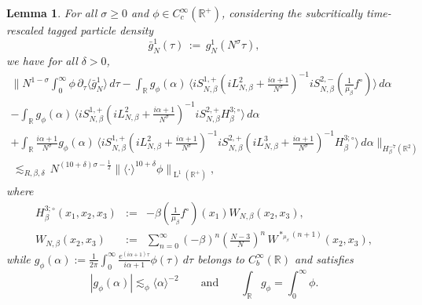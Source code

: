 \documentclass[a4paper,11pt,reqno,noindent]{amsart}
\theoremstyle{plain}
\newtheorem{lem}{Lemma}[section]
\numberwithin{equation}{section}
\newcommand{\R}{\mathbb R}
\newcommand{\3}{|\!|\!|}
\newcommand{\Ld}{\operatorname{L}}
\begin{document}
\begin{lem}\label{lem:laplace-NG}
For all $\sigma\ge0$ and $\phi\in C^\infty_c(\R^+)$, considering the subcritically time-rescaled tagged particle density
\[\bar g_N^{1}(\tau)\,:=\, g_N^1(N^\sigma\tau),\]
we have for all $\delta>0$,
\begin{multline*}
\Big\|N^{1-\sigma}\int_0^\infty\phi\,\partial_\tau \langle\bar g_N^1\rangle\,d\tau-\int_\R g_\phi(\alpha)\,\big\langle iS_{N,\beta}^{1,+}(iL_{N,\beta}^2+\tfrac{i\alpha+1}{N^\sigma})^{-1} iS_{N,\beta}^{2,-}(\tfrac1{\mu_\beta}f^\circ)\big\rangle\,d\alpha\\
-\int_\R g_\phi(\alpha)\,\big\langle iS_{N,\beta}^{1,+}(iL_{N,\beta}^2+\tfrac{i\alpha+1}{N^\sigma})^{-1}iS_{N,\beta}^{2,+}H_\beta^{3;\circ}\big\rangle\,d\alpha\\
+\int_\R\tfrac{i\alpha+1}{N^\sigma} g_\phi(\alpha)\,\big\langle iS_{N,\beta}^{1,+}(iL_{N,\beta}^2+\tfrac{i\alpha+1}{N^\sigma})^{-1}iS_{N,\beta}^{2,+}(iL_{N,\beta}^3+\tfrac{i\alpha+1}{N^\sigma})^{-1}H_\beta^{3;\circ}\big\rangle\,d\alpha\Big\|_{H^{-7}_\beta(\R^2)}\\
\,\lesssim_{R,\beta,\delta}\,N^{(10+\delta)\sigma-\frac12}\|\langle\cdot\rangle^{10+\delta}\phi\|_{\Ld^1(\R^+)},
\end{multline*}
where
\begin{eqnarray}
H^{3;\circ}_\beta(x_1,x_2,x_3)&:=&-\beta(\tfrac1{\mu_\beta}f^\circ)(x_1)W_{N,\beta}(x_2,x_3),\label{eq:def-Hbeta30-00}\\
W_{N,\beta}(x_2,x_3)&:=&\sum_{n=0}^\infty(-\beta)^n(\tfrac{N-3}N)^n\,W^{\ast_{\mu_\beta}(n+1)}(x_2,x_3),\nonumber
\end{eqnarray}
while $g_\phi(\alpha):=\frac1{2\pi}\int_0^\infty\frac{e^{(i\alpha+1)\tau}}{i\alpha+1}\phi(\tau)\,d\tau$ belongs to $C_b^\infty(\R)$ and satisfies
\[|g_\phi(\alpha)|\lesssim_\phi\langle\alpha\rangle^{-2}\qquad\text{and}\qquad\int_\R g_\phi=\int_0^\infty\phi.\]
\end{lem}
\end{document}
